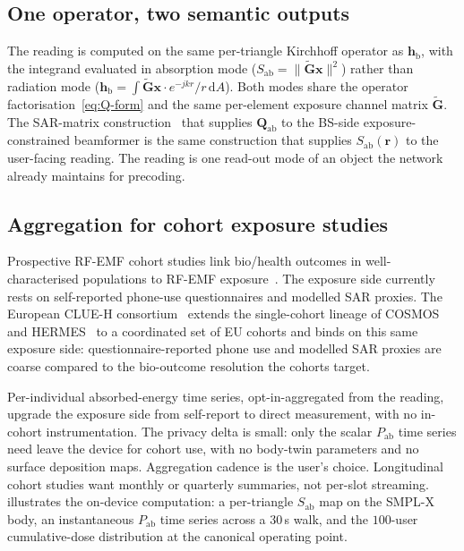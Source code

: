 \documentclass[journal,twocolumn,10pt]{IEEEtran}
\theoremstyle{plain}
\theoremstyle{definition}
\theoremstyle{remark}
\newcommand{\rr}{\mathbf{r}}
\newcommand{\xx}{\mathbf{x}}
\newcommand{\Sab}{S_{\mathrm{ab}}}
\newcommand{\Pabs}{P_{\mathrm{ab}}}
\newcommand{\Qabs}{\mathbf{Q}_{\mathrm{ab}}}
\newcommand{\hbody}{\bm{h}_{\mathrm{b}}}
\begin{document}
\subsection{One operator, two semantic outputs}

The reading is computed on the same per-triangle Kirchhoff
operator as $\hbody$, with the integrand evaluated in absorption
mode ($\Sab = \|\tilde{\bm{G}}\xx\|^{2}$) rather than radiation
mode ($\hbody = \int \tilde{\bm{G}}\xx \cdot e^{-jkr}/r\,\mathrm{d}A$).
Both modes share the operator factorisation~\cref{eq:Q-form} and
the same per-element exposure channel matrix $\tilde{\bm{G}}$.
The SAR-matrix construction~\cite{Hochwald2014,Ying2015,Ying2017}
that supplies $\Qabs$ to the BS-side exposure-constrained
beamformer is the same construction that supplies $\Sab(\rr)$ to
the user-facing reading. The reading is one read-out mode of an
object the network already maintains for precoding.

\subsection{Aggregation for cohort exposure studies}

Prospective RF-EMF cohort studies link bio/health outcomes in
well-characterised populations to RF-EMF
exposure~\cite{Roosli2010,Roosli2021,vanWel2024}. The exposure
side currently rests on self-reported phone-use questionnaires
and modelled SAR proxies. The European CLUE-H
consortium~\cite{CLUEH2025} extends the single-cohort lineage of
COSMOS~\cite{Roosli2021} and HERMES~\cite{Roosli2010} to a
coordinated set of EU cohorts and binds on this same exposure
side: questionnaire-reported phone use and modelled SAR proxies
are coarse compared to the bio-outcome resolution the cohorts
target.

Per-individual absorbed-energy time series, opt-in-aggregated
from the reading, upgrade the exposure side from self-report to
direct measurement, with no in-cohort instrumentation. The
privacy delta is small: only the scalar $\Pabs$ time series need
leave the device for cohort use, with no body-twin parameters
and no surface deposition maps. Aggregation cadence is the
user's choice. Longitudinal cohort studies want monthly or
quarterly summaries, not per-slot streaming.
 illustrates the on-device computation:
a per-triangle $\Sab$ map on the SMPL-X body, an instantaneous
$\Pabs$ time series across a $30\,$s walk, and the $100$-user
cumulative-dose distribution at the canonical operating point.
\end{document}
